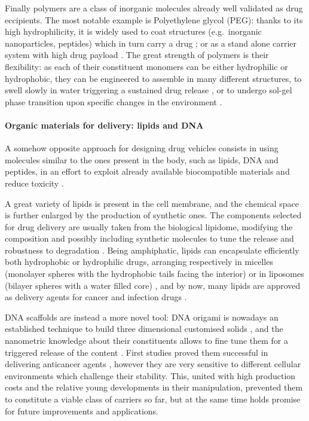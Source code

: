 Finally polymers are a class of inorganic molecules already well validated as drug eccipients. The most notable example is Polyethylene glycol (PEG): thanks to its high hydrophilicity, it is widely used to coat structures (e.g.\ inorganic nanoparticles, peptides) which in turn carry a drug \citep{Lammers2009}; or as a stand alone carrier system with high drug payload \citep{Liechty2010}. The great strength of polymers is their flexibility: as each of their constituent monomers can be either hydrophilic or hydrophobic, they can be engineered to assemble in many different structures, to swell slowly in water triggering a sustained drug release \citep{Nicolas2013}, or to undergo sol-gel phase transition upon specific changes in the environment \citep{Liechty2010}.


\paragraph{Organic materials for delivery: lipids and DNA} \label{sec:organic}

A somehow opposite approach for designing drug vehicles consists in using molecules similar to the ones present in the body, such as lipids, DNA and peptides, in an effort to exploit already available biocompatible materials and reduce toxicity \citep{Yoo2011}.

A great variety of lipids is present in the cell membrane, and the chemical space is further enlarged by the production of synthetic ones. The components selected for drug delivery are usually taken from the biological lipidome, modifying the composition and possibly including synthetic molecules to tune the release and robustness to degradation \citep{Yingchoncharoen2016}.
%
Being amphiphatic, lipids can encapsulate efficiently both hydrophobic or hydrophilic drugs, arranging respectively in micelles (monolayer spheres with the hydrophobic tails facing the interior) or in liposomes (bilayer spheres with a water filled core) \citep{Bunker2016}, and by now, many lipids are approved as delivery agents for cancer and infection drugs \citep{Pattni2015paper, Jain2017}.

DNA scaffolds are instead a more novel tool: DNA origami is nowadays an established technique to build three dimensional customised solids \citep{Linko2015}, and the nanometric knowledge about their constituents allows to fine tune them for a triggered release of the content \citep{Douglas2012}. First studies proved them successful in delivering anticancer agents \citep{Zhang2014, Jiang2012}, however they are very sensitive to different cellular environments which challenge their stability. This, united with high production costs and the relative young developments in their manipulation, prevented them to constitute a viable class of carriers so far, but at the same time holds promise for future improvements and applications.


